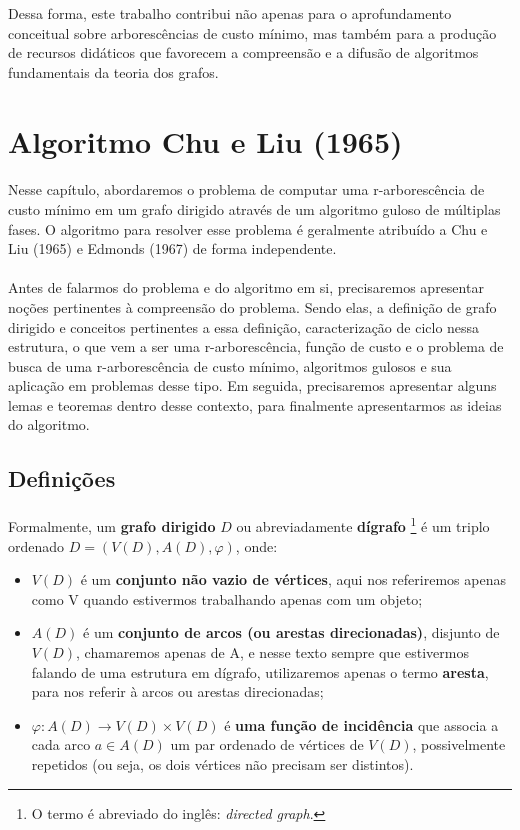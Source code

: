 \documentclass[12pt,a4paper]{article}
\begin{document}
Dessa forma, este trabalho contribui não apenas para o aprofundamento conceitual sobre arborescências de custo mínimo, mas também para a produção de recursos didáticos que favorecem a compreensão e a difusão de algoritmos fundamentais da teoria dos grafos.

\section{Algoritmo Chu e Liu (1965)}
\paragraph{}
Nesse capítulo, abordaremos o problema de computar uma r-arborescência de custo mínimo em um grafo dirigido através de um algoritmo guloso de múltiplas fases. O algoritmo para resolver esse problema é geralmente atribuído a Chu e Liu (1965) e Edmonds (1967) de forma independente.

\paragraph{}
Antes de falarmos do problema e do algoritmo em si, precisaremos apresentar noções pertinentes à compreensão do problema. Sendo elas, a definição de grafo dirigido e conceitos pertinentes a essa definição, caracterização de ciclo nessa estrutura, o que vem a ser uma r-arborescência, função de custo e o problema de busca de uma r-arborescência de custo mínimo, algoritmos gulosos e sua aplicação em problemas desse tipo. Em seguida, precisaremos apresentar alguns lemas e teoremas dentro desse contexto, para finalmente apresentarmos as ideias do algoritmo.

\subsection{Definições}
\paragraph{}
Formalmente, um \textbf{grafo dirigido} \(D\) ou abreviadamente \textbf{dígrafo} 
\footnote{O termo é abreviado do inglês: \textit{directed graph}.} é um triplo ordenado \(D = (V(D), A(D), \varphi)\), onde:
\begin{itemize}
    \item \(V(D)\) é um \textbf{conjunto não vazio de vértices}, aqui nos referiremos apenas como V quando estivermos trabalhando apenas com um objeto;
    \item \(A(D)\) é um \textbf{conjunto de arcos (ou arestas direcionadas)}, disjunto de \(V(D)\), chamaremos apenas de A, e nesse texto sempre que estivermos falando de uma estrutura em dígrafo, utilizaremos apenas o termo \textbf{aresta}, para nos referir à arcos ou arestas direcionadas;
    \item \(\varphi: A(D) \to V(D) \times V(D)\) é \textbf{uma função de incidência} que associa a cada arco \(a \in A(D)\) um par ordenado de vértices de \(V(D)\), possivelmente repetidos (ou seja, os dois vértices não precisam ser distintos).
\end{itemize}
\end{document}
